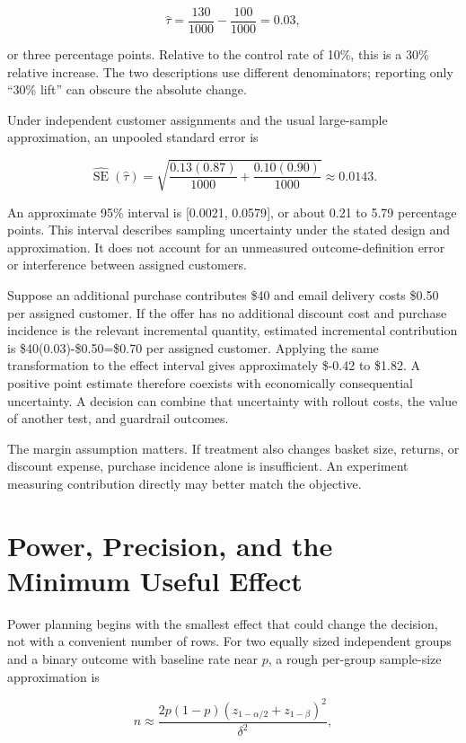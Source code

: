 \[
\hat\tau=\frac{130}{1000}-\frac{100}{1000}=0.03,
\]

or three percentage points. Relative to the control rate of 10\%, this
is a 30\% relative increase. The two descriptions use different
denominators; reporting only ``30\% lift'' can obscure the absolute
change.

Under independent customer assignments and the usual large-sample
approximation, an unpooled standard error is

\[
\widehat{\operatorname{SE}}(\hat\tau)
=\sqrt{\frac{0.13(0.87)}{1000}+\frac{0.10(0.90)}{1000}}
\approx0.0143.
\]

An approximate 95\% interval is {[}0.0021, 0.0579{]}, or about 0.21 to
5.79 percentage points. This interval describes sampling uncertainty
under the stated design and approximation. It does not account for an
unmeasured outcome-definition error or interference between assigned
customers.

Suppose an additional purchase contributes \$40 and email delivery costs
\$0.50 per assigned customer. If the offer has no additional discount
cost and purchase incidence is the relevant incremental quantity,
estimated incremental contribution is \$40(0.03)-\$0.50=\$0.70 per
assigned customer. Applying the same transformation to the effect
interval gives approximately \$-0.42 to \$1.82. A positive point
estimate therefore coexists with economically consequential uncertainty.
A decision can combine that uncertainty with rollout costs, the value of
another test, and guardrail outcomes.

The margin assumption matters. If treatment also changes basket size,
returns, or discount expense, purchase incidence alone is insufficient.
An experiment measuring contribution directly may better match the
objective.

\hypertarget{M06-power-precision-and-the-minimum-useful-effect}{%
\section{Power, Precision, and the Minimum Useful
Effect}\label{M06-power-precision-and-the-minimum-useful-effect}}

\noindent Power planning begins with the smallest effect that could change the
decision, not with a convenient number of rows. For two equally sized
independent groups and a binary outcome with baseline rate near \(p\), a
rough per-group sample-size approximation is

\[
n\approx\frac{2p(1-p)(z_{1-\alpha/2}+z_{1-\beta})^2}{\delta^2},
\]

